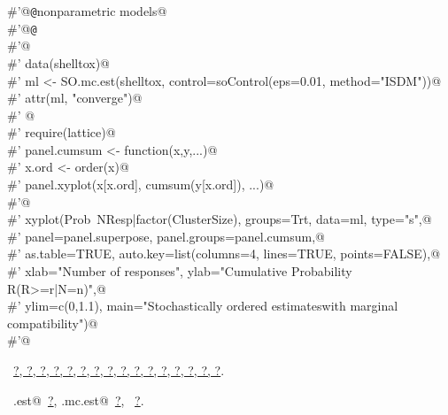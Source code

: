 \documentclass[reqno]{amsart}
\renewcommand{\NWlink}[2]{\hyperlink{#1}{#2}}
\begin{document}
\begin{flushleft}
\begin{list}{}{}
\mbox{}\verb@#'@{\tt @}\verb@keywords nonparametric models@\\
\mbox{}\verb@#'@{\tt @}\verb@examples@\\
\mbox{}\verb@#'@\\
\mbox{}\verb@#'  data(shelltox)@\\
\mbox{}\verb@#'  ml <- SO.mc.est(shelltox, control=soControl(eps=0.01, method="ISDM"))@\\
\mbox{}\verb@#'  attr(ml, "converge")@\\
\mbox{}\verb@#'  @\\
\mbox{}\verb@#'  require(lattice)@\\
\mbox{}\verb@#'  panel.cumsum <- function(x,y,...){@\\
\mbox{}\verb@#'    x.ord <- order(x)@\\
\mbox{}\verb@#'    panel.xyplot(x[x.ord], cumsum(y[x.ord]), ...)}@\\
\mbox{}\verb@#'@\\
\mbox{}\verb@#'  xyplot(Prob~NResp|factor(ClusterSize), groups=Trt, data=ml, type="s",@\\
\mbox{}\verb@#'       panel=panel.superpose, panel.groups=panel.cumsum,@\\
\mbox{}\verb@#'       as.table=TRUE, auto.key=list(columns=4, lines=TRUE, points=FALSE),@\\
\mbox{}\verb@#'       xlab="Number of responses", ylab="Cumulative Probability R(R>=r|N=n)",@\\
\mbox{}\verb@#'       ylim=c(0,1.1), main="Stochastically ordered estimates\n with marginal compatibility")@\\
\mbox{}\verb@#'@\\
\mbox{}\verb@@{\NWsep}
\end{list}
\vspace{-1.5ex}
\footnotesize
\begin{list}{}{\setlength{\itemsep}{-\parsep}\setlength{\itemindent}{-\leftmargin}}
\item \NWtxtFileDefBy\ \NWlink{nuweb?}{?}\NWlink{nuweb?}{, ?}\NWlink{nuweb?}{, ?}\NWlink{nuweb?}{, ?}\NWlink{nuweb?}{, ?}\NWlink{nuweb?}{, ?}\NWlink{nuweb?}{, ?}\NWlink{nuweb?}{, ?}\NWlink{nuweb?}{, ?}\NWlink{nuweb?}{, ?}\NWlink{nuweb?}{, ?}\NWlink{nuweb?}{, ?}\NWlink{nuweb?}{, ?}\NWlink{nuweb?}{, ?}\NWlink{nuweb?}{, ?}\NWlink{nuweb?}{, ?}.
\item \NWtxtIdentsUsed\nobreak\  \verb@mc.est@\nobreak\ \NWlink{nuweb?}{?}, \verb@SO.mc.est@\nobreak\ \NWlink{nuweb?}{?}, \verb@soControl@\nobreak\ \NWlink{nuweb?}{?}.
\item{}
\end{list}
\vspace{4ex}
\end{flushleft}
\end{document}

